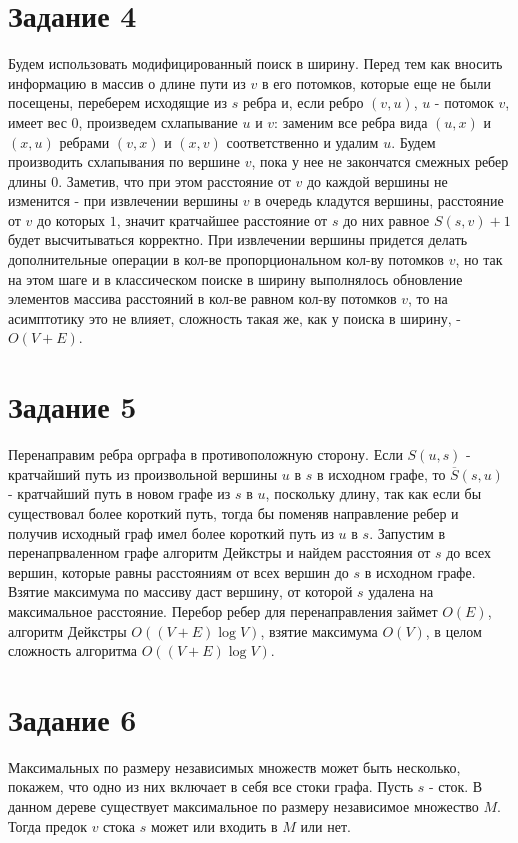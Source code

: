 \documentclass[a4paper,12pt]{article}
\begin{document}
\section*{Задание 4}
\hspace{0.5cm}
Будем использовать модифицированный поиск в ширину. Перед тем как вносить информацию в массив о длине пути из $v$ в его потомков, которые еще не были посещены, переберем исходящие из $s$ ребра и, если ребро $(v,u)$, $u$ - потомок $v$, имеет вес $0$, произведем схлапывание $u$ и $v$: заменим все ребра вида $(u,x)$ и $(x,u)$ ребрами $(v,x)$ и $(x,v)$ соответственно и удалим $u$. Будем производить схлапывания по вершине $v$, пока у нее не закончатся смежных ребер длины $0$. Заметив, что при этом расстояние от $v$ до каждой вершины не изменится - при извлечении вершины $v$ в очередь кладутся вершины, расстояние от $v$ до которых $1$, значит кратчайшее расстояние от $s$ до них равное $S(s,v)+1$ будет высчитываться корректно. При извлечении вершины придется делать дополнительные операции в кол-ве пропорциональном кол-ву потомков $v$, но так на этом шаге и в классическом поиске в ширину выполнялось обновление элементов массива расстояний в кол-ве равном кол-ву потомков $v$, то на асимптотику это не влияет, сложность такая же, как у поиска в ширину, - $O(V+E)$.

\section*{Задание 5}
\hspace{0.5cm}
Перенаправим ребра орграфа в противоположную сторону. Если $S(u,s)$ - кратчайший путь из произвольной вершины $u$ в $s$ в исходном графе, то $\overline{S}(s,u)$ - кратчайший путь в новом графе из $s$ в $u$, поскольку длину, так как если бы существовал более короткий путь, тогда бы поменяв направление ребер и получив исходный граф имел более короткий путь из $u$ в $s$. Запустим в перенапрваленном графе алгоритм Дейкстры и найдем расстояния от $s$ до всех вершин, которые равны расстояниям от всех вершин до $s$ в исходном графе. Взятие максимума по массиву даст вершину, от которой $s$ удалена на максимальное расстояние. Перебор ребер для перенаправления займет $O(E)$, алгоритм Дейкстры $O((V+E)\log{V})$, взятие максимума $O(V)$, в целом сложность алгоритма $O((V+E)\log{V})$.

\section*{Задание 6}
\hspace{0.5cm}
Максимальных по размеру независимых множеств может быть несколько, покажем, что одно из них включает в себя все стоки графа. Пусть $s$ - сток. В данном дереве существует максимальное по размеру независимое множество $M$. Тогда предок $v$ стока $s$ может или входить в $M$ или нет. 
\end{document}
